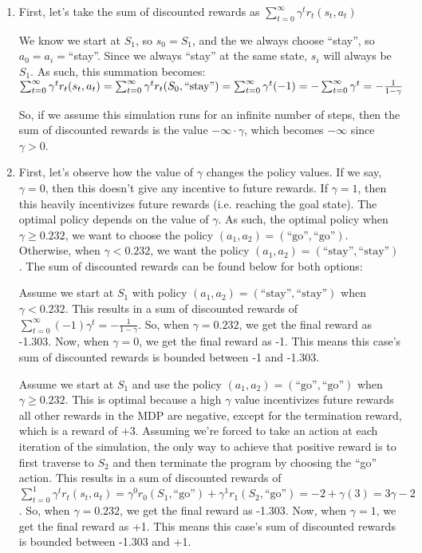 \documentclass[11pt,english]{article}
\begin{document}
\begin{enumerate}
	\item First, let's take the sum of discounted rewards as $\sum_{t=0}^{\infty} \gamma^t r_t(s_t, a_t)$
	
	We know we start at $S_1$, so $s_0 = S_1$, and the we always choose ``stay'', so $a_0 = a_i = $``stay''. Since we always ``stay'' at the same state, $s_i$ will always be $S_1$. As such, this summation becomes:\\
	
	$\sum_{t=0}^{\infty} \gamma^t r_t(s_t, a_t)\\
	= \sum_{t=0}^{\infty} \gamma^t r_t(S_0, \text{``stay''})\\
	= \sum_{t=0}^{\infty} \gamma^t (-1)\\
	= -\sum_{t=0}^{\infty} \gamma^t\\
	= -\frac{1}{1-\gamma}$
	
	So, if we assume this simulation runs for an infinite number of steps, then the sum of discounted rewards is the value $-\infty\cdot\gamma$, which becomes $-\infty$ since $\gamma > 0$.\pagebreak
	
	\item First, let's observe how the value of $\gamma$ changes the policy values. If we say, $\gamma = 0$, then this doesn't give any incentive to future rewards. If $\gamma = 1$, then this heavily incentivizes future rewards (i.e. reaching the goal state). The optimal policy depends on the value of $\gamma$. As such, the optimal policy when $\gamma \geq 0.232$, we want to choose the policy $(a_1, a_2) = (\text{``go''}, \text{``go''})$. Otherwise, when $\gamma < 0.232$, we want the policy $(a_1, a_2) = (\text{``stay''}, \text{``stay''})$. The sum of discounted rewards can be found below for both options:
	
	Assume we start at $S_1$ with policy $(a_1, a_2) = (\text{``stay''}, \text{``stay''})$ when $\gamma < 0.232$. This results in a sum of discounted rewards of $\sum_{t=0}^{\infty} (-1)\gamma^t = -\frac{1}{1-\gamma}$. So, when $\gamma = 0.232$, we get the final reward as -1.303. Now, when $\gamma = 0$, we get the final reward as -1. This means this case's sum of discounted rewards is bounded between -1 and -1.303.
	
	Assume we start at $S_1$ and use the policy $(a_1, a_2) = (\text{``go''}, \text{``go''})$ when $\gamma \geq 0.232$. This is optimal because a high $\gamma$ value incentivizes future rewards all other rewards in the MDP are negative, except for the termination reward, which is a reward of +3. Assuming we're forced to take an action at each iteration of the simulation, the only way to achieve that positive reward is to first traverse to $S_2$ and then terminate the program by choosing the ``go'' action. This results in a sum of discounted rewards of $\sum_{t=0}^{1} \gamma^t r_t(s_t, a_t) = \gamma^0 r_0(S_1, \text{``go''}) + \gamma^1 r_1(S_2, \text{``go''}) = -2 + \gamma (3) = 3\gamma - 2$. So, when $\gamma = 0.232$, we get the final reward as -1.303. Now, when $\gamma = 1$, we get the final reward as +1. This means this case's sum of discounted rewards is bounded between -1.303 and +1.
	

\end{enumerate}
\end{document}
